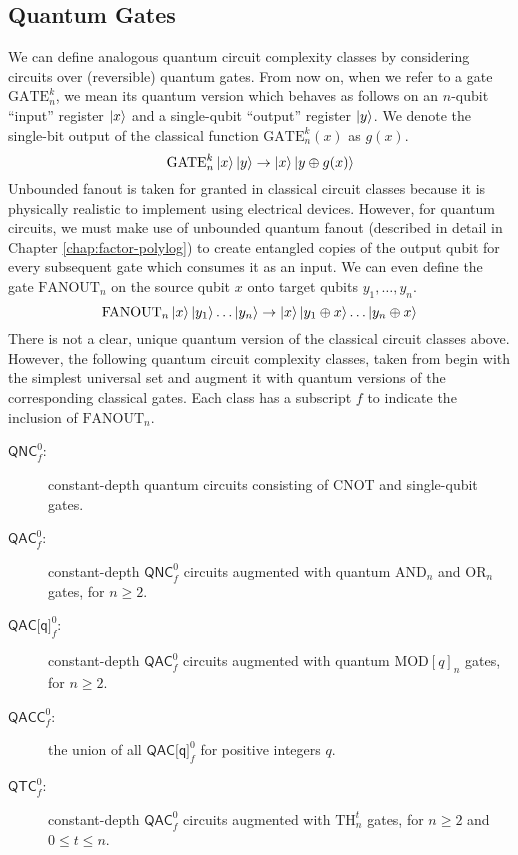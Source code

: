 \subsection{Quantum Gates}

We can define analogous quantum circuit complexity classes by
considering circuits over (reversible) quantum gates. From
now on, when we refer to a gate $\text{GATE}^k_n$, we mean
its quantum version which behaves as follows on an $n$-qubit
``input'' register $\left\vert{x}\right\rangle$ and a single-qubit ``output''
register $\left\vert{y}\right\rangle$. We denote the single-bit output of the
classical function $\text{GATE}^k_n(x)$ as $g(x)$.
%
\begin{equation}
\text{GATE}^k_n\left\vert{x}\right\rangle\left\vert{y}\right\rangle \rightarrow \left\vert{x}\right\rangle\left\vert{y \oplus g(x)}\right\rangle
\end{equation}
%
Unbounded fanout is taken for granted in classical circuit classes
because it is physically realistic to implement using electrical
devices. However, for quantum circuits, we must make use of
unbounded quantum fanout (described in detail in Chapter \ref{chap:factor-polylog})
to create entangled copies of the output qubit for every subsequent
gate which consumes it as an input. We can even define the
gate $\text{FANOUT}_n$ on the source qubit $x$ onto target qubits
$y_1, \ldots, y_n$.
%
\begin{equation}
\text{FANOUT}_n\left\vert{x}\right\rangle\left\vert{y_1}\right\rangle\ldots\left\vert{y_n}\right\rangle \rightarrow \left\vert{x}\right\rangle\left\vert{y_1 \oplus x}\right\rangle\ldots\left\vert{y_n \oplus x}\right\rangle
\end{equation}
%
There is not a clear, unique quantum version of the classical
circuit classes above. However, the following quantum circuit
complexity classes, taken from \cite{Hoyer2002}
begin with the simplest universal set and augment it with
quantum versions of the corresponding classical gates. Each
class has a subscript $f$ to indicate the inclusion of
$\text{FANOUT}_n$.
%
\begin{description}
\item[$\textsf{QNC}^0_f$:]
constant-depth quantum circuits consisting of CNOT and single-qubit gates.
\item[$\textsf{QAC}^0_f$:]
constant-depth $\textsf{QNC}^0_f$ circuits augmented with quantum $\text{AND}_n$ and $\text{OR}_n$ gates,
for $n \ge 2$.
\item[$\textsf{QAC[q]}^0_f$:]
constant-depth $\textsf{QAC}^0_f$ circuits augmented with quantum $\text{MOD}[q]_n$ gates,
for $n \ge 2$.
\item[$\textsf{QACC}^0_f$:] the union of all $\textsf{QAC[q]}^0_f$ for positive integers $q$.
\item[$\textsf{QTC}^0_f$:]
constant-depth $\textsf{QAC}^0_f$ circuits augmented with $\text{TH}_n^t$ gates, for $n \ge 2$ and
$0 \le t \le n$.
\end{description}
